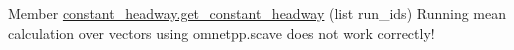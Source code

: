 
\begin{DoxyRefList}
\item[Member \mbox{\hyperlink{constant__headway_8py_a969b5761f9fc8f873b6378eb48208cc2}{constant\+\_\+headway.get\+\_\+constant\+\_\+headway}} (list run\+\_\+ids)]\label{bug__bug000001}%
%
Running mean calculation over vectors using omnetpp.\+scave does not work correctly! 
\end{DoxyRefList}